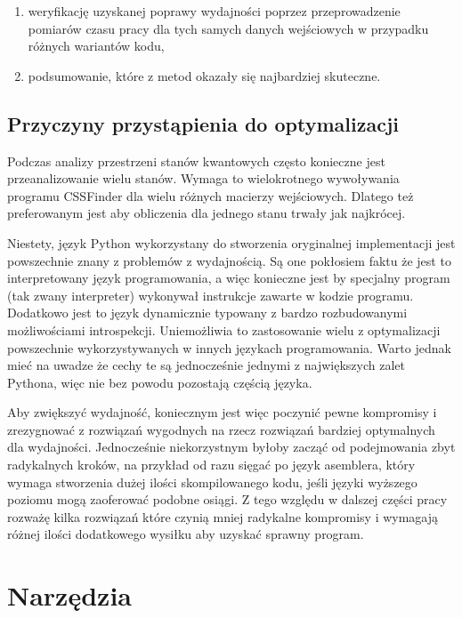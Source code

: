 \documentclass[11pt, a4paper]{article}
\begin{document}
\begin{sloppypar}
\begin{enumerate}
      \item weryfikację uzyskanej poprawy wydajności poprzez przeprowadzenie pomiarów czasu
        pracy dla tych samych danych wejściowych w przypadku różnych wariantów kodu,

      \item podsumowanie, które z metod okazały się najbardziej skuteczne.
    \end{enumerate}

    \subsection{Przyczyny przystąpienia do optymalizacji}
    Podczas analizy przestrzeni stanów kwantowych często konieczne jest przeanalizowanie
    wielu stanów. Wymaga to wielokrotnego wywoływania programu CSSFinder dla wielu różnych
    macierzy wejściowych. Dlatego też preferowanym jest aby obliczenia dla jednego stanu
    trwały jak najkrócej.

    Niestety, język Python wykorzystany do stworzenia oryginalnej implementacji jest powszechnie
    znany z problemów z wydajnością\cite{srinath2017python}. Są one pokłosiem faktu że jest
    to interpretowany język programowania, a więc konieczne jest by specjalny program (tak
    zwany interpreter) wykonywał instrukcje zawarte w kodzie programu. Dodatkowo jest to
    język dynamicznie typowany z bardzo rozbudowanymi możliwościami introspekcji.
    Uniemożliwia to zastosowanie wielu z optymalizacji powszechnie wykorzystywanych w
    innych językach programowania. Warto jednak mieć na uwadze że cechy te są jednocześnie
    jednymi z największych zalet Pythona, więc nie bez powodu pozostają częścią języka.

    Aby zwiększyć wydajność, koniecznym jest więc poczynić pewne kompromisy i zrezygnować
    z rozwiązań wygodnych na rzecz rozwiązań bardziej optymalnych dla wydajności.
    Jednocześnie niekorzystnym byłoby zacząć od podejmowania zbyt radykalnych kroków, na
    przykład od razu sięgać po język asemblera, który wymaga stworzenia dużej ilości
    skompilowanego kodu, jeśli języki wyższego poziomu mogą zaoferować podobne osiągi. Z
    tego względu w dalszej części pracy rozważę kilka rozwiązań które czynią mniej
    radykalne kompromisy i wymagają różnej ilości dodatkowego wysiłku aby uzyskać
    sprawny program.

    \section{Narzędzia}

\end{sloppypar}
\end{document}
